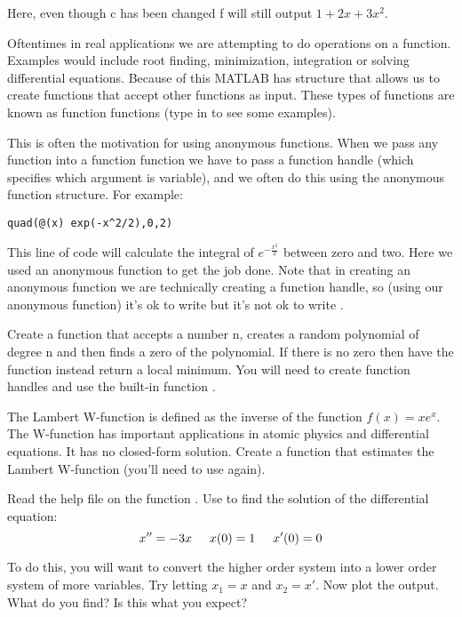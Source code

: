 Here, even though c has been changed f will still output $1 + 2x + 3x^2$.

Oftentimes in real applications we are attempting to do operations on a function. Examples would include root finding, minimization, integration or solving differential equations. Because of this MATLAB has structure that allows us to create functions that accept other functions as input. These types of functions are known as function functions (type in  to see some examples).

This is often the motivation for using anonymous functions. When we pass any function into a function function we have to pass a function handle (which specifies which argument is variable), and we often do this using the anonymous function structure. For example:

\begin{lstlisting}[style=matlab]
quad(@(x) exp(-x^2/2),0,2)
\end{lstlisting}

This line of code will calculate the integral of $e^{-\frac{x^2}{2}}$ between zero and two. Here we used an anonymous function to get the job done. Note that in creating an anonymous function we are technically creating a function handle, so (using our anonymous function) it's ok to write  but it's not ok to write .

\begin{problem}
Create a function that accepts a number n, creates a random polynomial of degree n and then finds a zero of the polynomial. If there is no zero then have the function instead return a local minimum. You will need to create function handles and use the built-in function .
\end{problem}

\begin{problem}
The Lambert W-function is defined as the inverse of the function $f(x) = xe^x$. The W-function has important applications in atomic physics and differential equations. It has no closed-form solution. Create a function that estimates the Lambert W-function (you'll need to use  again).
\end{problem}

\begin{problem}
	Read the help file on the function . Use  to find the solution of the differential equation:
	\[
		x'' = -3x \hspace{5 mm} x(0) = 1 \hspace{5mm} x'(0) = 0
	\]
	
	To do this, you will want to convert the higher order system into a lower order system of more variables. Try letting $x_1 = x$ and $x_2 = x'$.
	Now plot the output. What do you find? Is this what you expect?
\end{problem}

